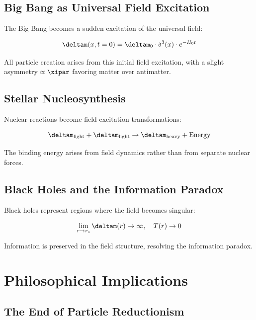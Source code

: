 	\subsection{Big Bang as Universal Field Excitation}
	
	The Big Bang becomes a sudden excitation of the universal field:
	
	\begin{equation}
		\deltam(x,t=0) = \deltam_0 \cdot \delta^3(x) \cdot e^{-H_0 t}
		\label{eq:big_bang_field}
	\end{equation}
	
	All particle creation arises from this initial field excitation, with a slight asymmetry $\propto \xipar$ favoring matter over antimatter.
	
	\subsection{Stellar Nucleosynthesis}
	
	Nuclear reactions become field excitation transformations:
	
	\begin{equation}
		\deltam_{\text{light}} + \deltam_{\text{light}} \rightarrow \deltam_{\text{heavy}} + \text{Energy}
		\label{eq:nucleosynthesis_field}
	\end{equation}
	
	The binding energy arises from field dynamics rather than from separate nuclear forces.
	
	\subsection{Black Holes and the Information Paradox}
	
	Black holes represent regions where the field becomes singular:
	
	\begin{equation}
		\lim_{r \to r_s} \deltam(r) \to \infty, \quad T(r) \to 0
		\label{eq:black_hole_singularity}
	\end{equation}
	
	Information is preserved in the field structure, resolving the information paradox.
	
	\section{Philosophical Implications}
	
	\subsection{The End of Particle Reductionism}
	
